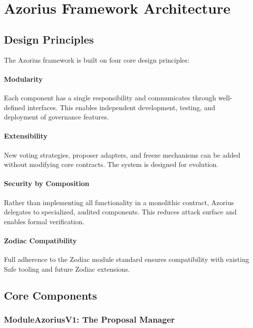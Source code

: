 \section{Azorius Framework Architecture}


\subsection{Design Principles}

The Azorius framework is built on four core design principles:

\paragraph{Modularity} Each component has a single responsibility and communicates through well-defined interfaces. This enables independent development, testing, and deployment of governance features.

\paragraph{Extensibility} New voting strategies, proposer adapters, and freeze mechanisms can be added without modifying core contracts. The system is designed for evolution.

\paragraph{Security by Composition} Rather than implementing all functionality in a monolithic contract, Azorius delegates to specialized, audited components. This reduces attack surface and enables formal verification.

\paragraph{Zodiac Compatibility} Full adherence to the Zodiac module standard ensures compatibility with existing Safe tooling and future Zodiac extensions.

\subsection{Core Components}

\subsubsection{ModuleAzoriusV1: The Proposal Manager}

